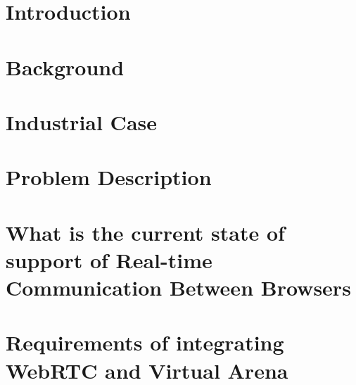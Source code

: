 \chapter{Introduction}


\chapter{Background}


%

%

\chapter{Industrial Case}
%

\chapter{Problem Description}
%



\chapter{What is the current state of support of Real-time Communication Between Browsers}


\chapter{Requirements of integrating WebRTC and Virtual Arena}
%

